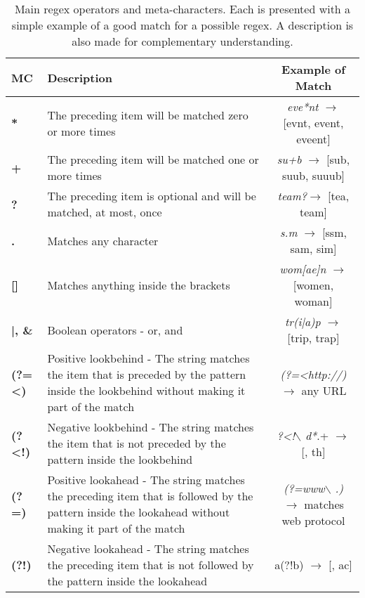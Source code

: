 \begin{table}[!h]
\centering
\renewcommand{\arraystretch}{1.25}
\begin{tabular}{ABC}
\toprule
\textbf{MC} & \textbf{Description} & \textbf{Example of Match}\\
\midrule
\textbf{*} & The preceding item will be matched zero or more times & \textit{eve*nt} $\rightarrow$ [evnt, event, eveent]\\

\textbf{+} & The preceding item will be matched one or more times & \textit{su+b} $\rightarrow$ [sub, suub, suuub]\\

\textbf{?} & The preceding item is optional and will be matched, at most, once & \textit{team?}$\rightarrow$ [tea, team]\\

\textbf{.} & Matches any character & \textit{s.m} $\rightarrow$ [ssm, sam, sim] \\

\textbf{[]} & Matches anything inside the brackets & \textit{wom[ae]n} $\rightarrow$ [women, woman] \\

\textbf{|, \&} & Boolean operators - or, and & \textit{tr(i|a)p} $\rightarrow$ [trip, trap]\\

\textbf{(?=<)} & Positive lookbehind - The string matches the item that is preceded by the pattern inside the lookbehind without making it part of the match & \textit{(?=<http://)} $\rightarrow$ any URL\\

\textbf{(?<!)} & Negative lookbehind - The string matches the item that is not preceded by the pattern inside the lookbehind & \textit{?<!$\backslash$ d*}.+ $\rightarrow$ [, th]\\

\textbf{(?=)} & Positive lookahead - The string matches the preceding item that is followed by the pattern inside the lookahead without making it part of the match & \textit{(?=www$\backslash$ .)} $\rightarrow$ matches web protocol\\

\textbf{(?!)} & Negative lookahead - The string matches the preceding item that is not followed by the pattern inside the lookahead & a(?!b) $\rightarrow$ [, ac]\\
\bottomrule
\end{tabular}
\caption{Main \gls{regex} operators and meta-characters. Each is presented with a simple example of a good match for a possible \gls{regex}. A description is also made for complementary understanding.}
\label{tab:regex}
\end{table}

